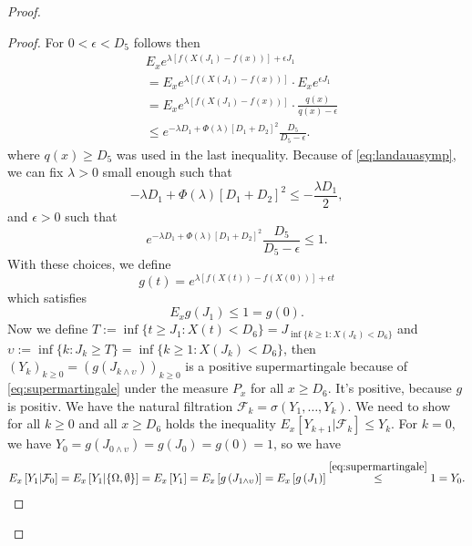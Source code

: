\documentclass[12pt,a4paper]{scrartcl}
\numberwithin{equation}{section}
\begin{document}
\begin{proof}
\begin{proof}
For $ 0 < \epsilon < D_5$ follows then
\begin{align*}
&E_x e^{\lambda\left[f\left(X\left(J_1\right) - f\left(x\right) \right) \right] + \epsilon J_1}\\
&= E_x e^{\lambda\left[f\left(X\left(J_1\right) - f\left(x\right) \right) \right]} \cdot E_x e^{\epsilon J_1}\\
&= E_x e^{\lambda\left[f\left(X\left(J_1\right) - f\left(x\right) \right) \right]} \cdot \frac{q\left(x\right)}{q\left(x\right) - \epsilon}\\
&\leq e^{-\lambda D_1 + \Phi\left(\lambda\right) \left[D_1 + D_2 \right]^2} \frac{D_5}{D_5 - \epsilon}.
\end{align*}
where $q\left(x\right) \geq D_5$ was used in the last inequality. 
Because of \eqref{eq:landauasymp}, we can fix $\lambda > 0$ small enough such that
$$ -\lambda D_1 + \Phi\left(\lambda\right) \left[D_1 + D_2 \right]^2 \leq - \frac{\lambda D_1}{2}, $$
and $\epsilon > 0$ such that
$$ e^{-\lambda D_1 + \Phi\left(\lambda\right) \left[D_1 + D_2 \right]^2} \frac{D_5}{D_5 - \epsilon} \leq  1.$$
With these choices, we define
$$g\left(t\right) = e^{\lambda\left[f\left(X\left(t\right) \right) - f\left(X\left(0\right)\right) \right] + \epsilon t}$$
which satisfies
\begin{equation} \label{eq:supermartingale}
E_x g\left(J_1\right) \leq 1 = g\left(0\right).
\end{equation}
Now we define $T:= \inf\lbrace t \geq J_1 : X\left(t\right) < D_6 \rbrace = J_{\inf\lbrace k\geq 1: X\left(J_k\right) < D_6 \rbrace}$ and $\upsilon := \inf \lbrace k: J_k \geq T\rbrace = \inf\lbrace k \geq 1 : X\left(J_k \right) < D_6 \rbrace  $,
then $\left(Y_k\right)_{k \geq 0} =\left(g\left(J_{k \wedge \upsilon} \right)\right)_{ k \geq 0} $ is a positive supermartingale because of \eqref{eq:supermartingale} under the measure $P_x$ for all $x \geq D_6$.
It's positive, because $g$ is positiv. We have the natural filtration $ \mathcal{F}_k = \sigma\left(Y_1,\ldots,Y_k \right). $ We need to show for all $k \geq 0$ and all $x \geq D_6$ holds the inequality $E_x\left[Y_{k+1} | \mathcal{F}_k \right] \leq Y_k.$
For $k=0$, we have $Y_0 = g\left(J_{0 \wedge \upsilon} \right) = g\left(J_0\right) = g\left(0\right) = 1$, so we have
\begin{align*}
E_x\left[Y_1 | \mathcal{F}_0 \right] = E_x\left[ Y_1 | \lbrace \Omega, \emptyset \rbrace \right] = E_x\left[Y_1 \right] = E_x\left[g\left(J_{1 \wedge \upsilon} \right) \right] = E_x\left[g\left(J_1 \right) \right] \overset{\eqref{eq:supermartingale}}{\leq} 1 = Y_0.
\end{align*}



\end{proof}
\end{proof}
\end{document}
